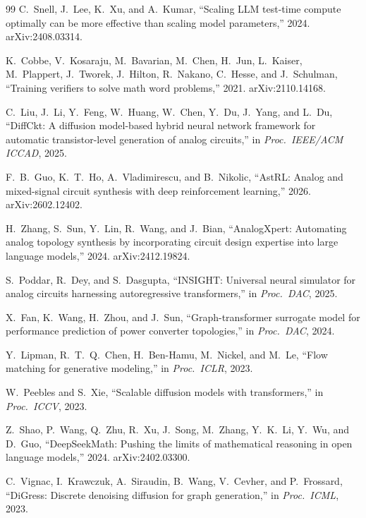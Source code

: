 \documentclass[conference]{IEEEtran}
\begin{document}
\begin{thebibliography}{99}
C.~Snell, J.~Lee, K.~Xu, and A.~Kumar,
``Scaling {LLM} test-time compute optimally can be more effective than
scaling model parameters,'' 2024. arXiv:2408.03314.

K.~Cobbe, V.~Kosaraju, M.~Bavarian, M.~Chen, H.~Jun, L.~Kaiser,
M.~Plappert, J.~Tworek, J.~Hilton, R.~Nakano, C.~Hesse, and
J.~Schulman,
``Training verifiers to solve math word problems,'' 2021.
arXiv:2110.14168.

C.~Liu, J.~Li, Y.~Feng, W.~Huang, W.~Chen, Y.~Du, J.~Yang, and L.~Du,
``{DiffCkt}: A diffusion model-based hybrid neural network framework for
automatic transistor-level generation of analog circuits,''
in \emph{Proc.\ IEEE/ACM ICCAD}, 2025.

F.~B.~Guo, K.~T.~Ho, A.~Vladimirescu, and B.~Nikolic,
``{AstRL}: Analog and mixed-signal circuit synthesis with deep
reinforcement learning,'' 2026. arXiv:2602.12402.

H.~Zhang, S.~Sun, Y.~Lin, R.~Wang, and J.~Bian,
``{AnalogXpert}: Automating analog topology synthesis by incorporating
circuit design expertise into large language models,'' 2024.
arXiv:2412.19824.

S.~Poddar, R.~Dey, and S.~Dasgupta,
``{INSIGHT}: Universal neural simulator for analog circuits
harnessing autoregressive transformers,'' in \emph{Proc.\ DAC}, 2025.

X.~Fan, K.~Wang, H.~Zhou, and J.~Sun,
``Graph-transformer surrogate model for performance prediction of
power converter topologies,'' in \emph{Proc.\ DAC}, 2024.

Y.~Lipman, R.~T.~Q.~Chen, H.~Ben-Hamu, M.~Nickel, and M.~Le,
``Flow matching for generative modeling,'' in \emph{Proc.\ ICLR},
2023.

W.~Peebles and S.~Xie,
``Scalable diffusion models with transformers,'' in \emph{Proc.\
ICCV}, 2023.

Z.~Shao, P.~Wang, Q.~Zhu, R.~Xu, J.~Song, M.~Zhang,
Y.~K.~Li, Y.~Wu, and D.~Guo,
``{DeepSeekMath}: Pushing the limits of mathematical reasoning in
open language models,'' 2024. arXiv:2402.03300.

C.~Vignac, I.~Krawczuk, A.~Siraudin, B.~Wang, V.~Cevher, and
P.~Frossard,
``{DiGress}: Discrete denoising diffusion for graph generation,''
in \emph{Proc.\ ICML}, 2023.


\end{thebibliography}
\end{document}
